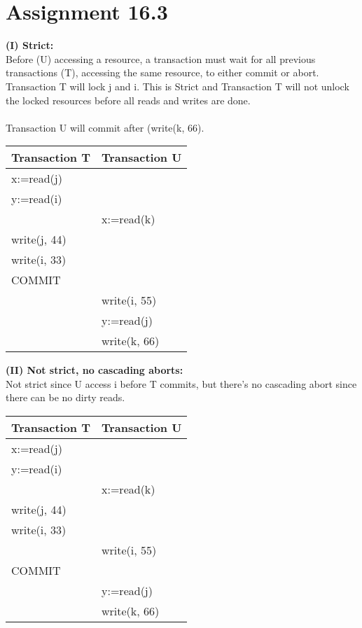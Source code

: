 \section{Assignment 16.3}

\textbf{(I) Strict:} \\
Before (U) accessing a resource, a transaction must wait for all previous transactions (T), accessing the same resource, to either commit or abort. \\Transaction T will lock j and i. This is Strict and Transaction T will not unlock the locked resources before all reads and writes are done.\\\\ Transaction U will commit after (write(k, 66). 

\begin{center}
	\begin{tabular}{| l | l |}
		\hline
		Transaction T & Transaction U \\ \hline
		x:=read(j) &  \\ \hline
		y:=read(i) &  \\ \hline
		 & x:=read(k) \\ \hline
		write(j, 44) &   \\ \hline
		write(i, 33) &  \\ \hline
		COMMIT &  \\ \hline
		 & write(i, 55)  \\ \hline
		 & y:=read(j)  \\ \hline
		 & write(k, 66)  \\
		\hline
	\end{tabular}
\end{center}

\textbf{(II) Not strict, no cascading aborts:} \\
Not strict since U access i before T commits, but there’s no cascading abort since there can be no dirty reads.

\begin{center}
	\begin{tabular}{| l | l |}
		\hline
		Transaction T & Transaction U \\ \hline
		x:=read(j) &  \\ \hline
		y:=read(i) &  \\ \hline
		 & x:=read(k) \\ \hline
		write(j, 44) &   \\ \hline
		write(i, 33) &  \\ \hline
		 & write(i, 55)  \\ \hline
		COMMIT &  \\ \hline
		 & y:=read(j)  \\ \hline
		 & write(k, 66) \\ 
		\hline
	\end{tabular}
\end{center}


